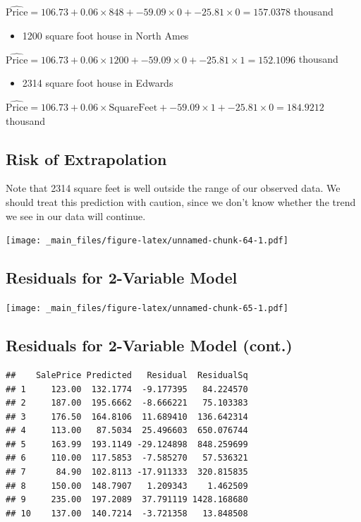 \documentclass[]{book}
\providecommand{\tightlist}{%
  \setlength{\itemsep}{0pt}\setlength{\parskip}{0pt}}
\begin{document}
\(\widehat{\text{Price}}= 106.73+ 0.06 \times848+ -59.09 \times0 +-25.81 \times 0 =157.0378\)
thousand

\begin{itemize}
\tightlist
\item
  1200 square foot house in North Ames
\end{itemize}

\(\widehat{\text{Price}}= 106.73+ 0.06 \times1200+ -59.09 \times0 +-25.81 \times1 = 152.1096\)
thousand

\begin{itemize}
\tightlist
\item
  2314 square foot house in Edwards
\end{itemize}

\(\widehat{\text{Price}}= 106.73+ 0.06 \times\text{SquareFeet}+ -59.09 \times1 +-25.81 \times 0 =184.9212\)
thousand

\subsection{Risk of Extrapolation}\label{risk-of-extrapolation}

Note that 2314 square feet is well outside the range of our observed
data. We should treat this prediction with caution, since we don't know
whether the trend we see in our data will continue.

\texttt{[image: \_main\_files/figure-latex/unnamed-chunk-64-1.pdf]}

\subsection{Residuals for 2-Variable
Model}\label{residuals-for-2-variable-model}

\texttt{[image: \_main\_files/figure-latex/unnamed-chunk-65-1.pdf]}

\subsection{Residuals for 2-Variable Model
(cont.)}\label{residuals-for-2-variable-model-cont.}

\begin{verbatim}
##    SalePrice Predicted   Residual  ResidualSq
## 1     123.00  132.1774  -9.177395   84.224570
## 2     187.00  195.6662  -8.666221   75.103383
## 3     176.50  164.8106  11.689410  136.642314
## 4     113.00   87.5034  25.496603  650.076744
## 5     163.99  193.1149 -29.124898  848.259699
## 6     110.00  117.5853  -7.585270   57.536321
## 7      84.90  102.8113 -17.911333  320.815835
## 8     150.00  148.7907   1.209343    1.462509
## 9     235.00  197.2089  37.791119 1428.168680
## 10    137.00  140.7214  -3.721358   13.848508
\end{verbatim}
\end{document}
